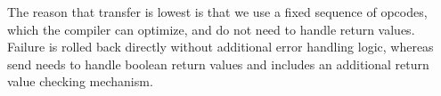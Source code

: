 The reason that transfer is lowest is that we use a fixed sequence of opcodes, which the compiler can optimize, and do not need to handle return values. Failure is rolled back directly without additional error handling logic, whereas send needs to handle boolean return values and includes an additional return value checking mechanism.